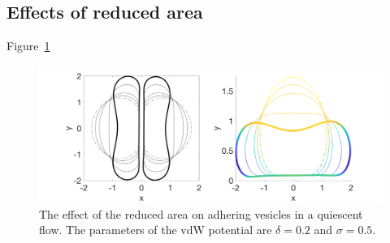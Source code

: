 \documentclass[%
preprint,
 amsmath,amssymb,
 aps,
]{revtex4-1}
\begin{document}

\subsection{Effects of reduced area}
\label{sec:qflow_reduced_area} 
Figure~\ref{fig:qflow_reduced_area}

\begin{figure}
\includegraphics[keepaspectratio=true,scale=0.5]{figs/nrelax2Ves02o_rA.png}
\caption{The effect of the reduced area on adhering vesicles in a
quiescent flow.  The parameters of the vdW potential are $\delta = 0.2$
and $\sigma = 0.5$.}
\label{fig:qflow_reduced_area}
\end{figure}



\newpage %
\end{document}
